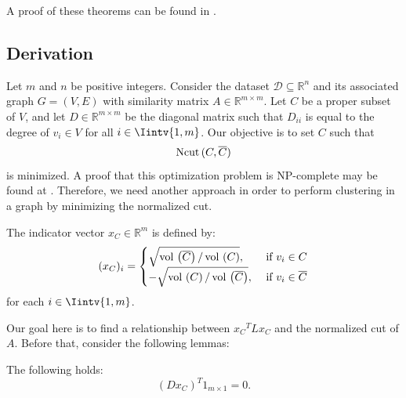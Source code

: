 A proof of these theorems can be found in \cite{minmax}.

\subsection{Derivation}

Let $m$ and $n$ be positive integers. 
Consider the dataset $\mathcal D \subseteq \mathbb R ^{n }$ and its associated graph $G = (V,E)$ with similarity matrix $A \in \mathbb R^{m \times m}$.
Let $C$ be a proper subset of $V$, and let $D \in \mathbb R ^{m \times m}$ be the diagonal matrix such that $D_{ii}$ is equal to the degree of $v_i \in V$ for all $i \in \Iintv{1,m}$.
Our objective is to set $C$ such that 
\begin{equation}
   \operatorname*{Ncut\,} (C, \overline C)
\end{equation}
is minimized.
A proof that this optimization problem is NP-complete may be found at \cite{normalized}. 
Therefore, we need another approach in order to perform clustering in a graph by minimizing the normalized cut.

\begin{definition}
The indicator vector $x_C \in \mathbb R ^{m }$ is defined by:
   \begin{equation} \label{indicator}
   (x_C)_i =
   \begin{cases}
      \sqrt{ \operatorname*{vol\,}  \left( \overline C \right) / \operatorname*{vol\,} \left( C \right) }, &\text{ if } v_i \in C \\
      -\sqrt{\operatorname*{vol\,} \left( C \right) / \operatorname*{vol\,} \left( \overline C \right)}, & \text{ if } v_i \in \overline C 
   \end{cases}
\end{equation}
for each $i \in \Iintv{1,m}$.
\end{definition}

Our goal here is to find a relationship between ${x_C}^T L x_C$ and the normalized cut of $A$.
Before that, consider the following lemmas:

\begin{lemma} \label{cond1}
   The following holds:
   \begin{equation}
      (D x_C)^T 1_{m \times 1} = 0.
   \end{equation}
\end{lemma}

